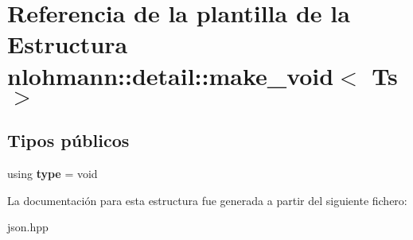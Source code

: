 \hypertarget{structnlohmann_1_1detail_1_1make__void}{}\section{Referencia de la plantilla de la Estructura nlohmann\+:\+:detail\+:\+:make\+\_\+void$<$ Ts $>$}
\label{structnlohmann_1_1detail_1_1make__void}
\subsection*{Tipos públicos}
\begin{DoxyCompactItemize}
\item 
\mbox{\label{structnlohmann_1_1detail_1_1make__void_a8961e24ae3b2cb65ec47d1ce805d94e4}} 
using {\bfseries type} = void
\end{DoxyCompactItemize}


La documentación para esta estructura fue generada a partir del siguiente fichero\+:\begin{DoxyCompactItemize}
\item 
json.\+hpp\end{DoxyCompactItemize}
